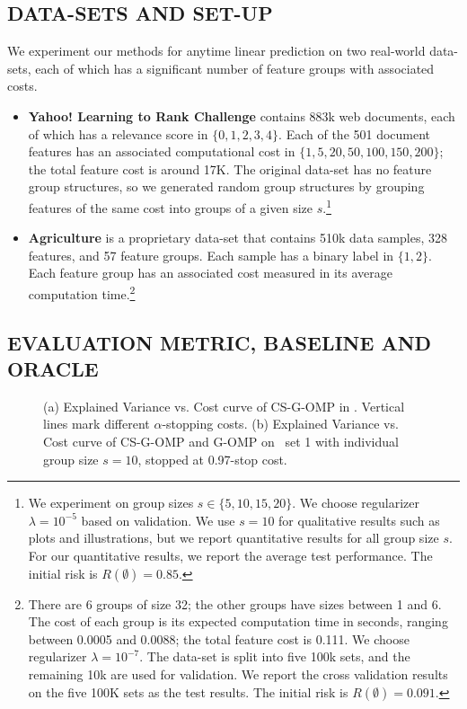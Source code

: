 \subsection{DATA-SETS AND SET-UP}
We experiment our methods for anytime linear prediction on two real-world data-sets,
each of which has a significant number of feature groups with associated costs. 

\begin{itemize}[leftmargin=*]
\item \textbf{Yahoo! Learning to Rank Challenge} \citep{yahoo_ltr}
contains 883k web documents, each of which has a relevance score in $\{0, 1, 2, 3, 4\}$. Each of the 501 document features has an associated computational cost in 
$\{ 1, 5, 20, 50, 100, 150, 200\}$; the total feature cost is around 17K. The original data-set has no feature group structures, so we generated random group structures by grouping features of the same cost into groups of a given size $s$.\footnote{We experiment on group sizes $s \in \{ 5, 10, 15, 20 \}$. We choose regularizer 
$\lambda = 10^{-5}$ based on validation. We use 
$s=10$ for qualitative results such as plots and illustrations, but we report quantitative results for all group size $s$. For our quantitative results, we report the average test performance. The initial risk is $R(\emptyset)=0.85$.}

\item \textbf{Agriculture} is a proprietary data-set that contains 510k data samples, 328 features, and 57 feature groups. Each sample has a binary label in $\{1, 2\}$. Each feature group has an associated cost measured in its 
average computation time.\footnote{
There are 6 groups of size 32; the other groups have sizes between 1 and 6. 
The cost of each group is its expected computation time in seconds, ranging between 0.0005 and 0.0088; the total feature cost is 0.111. 
We choose regularizer $\lambda = 10^{-7}$. The data-set is 
split into five 100k sets, and the remaining 10k are used for validation. We report the cross validation results on the five 100K sets as the test results. The initial risk is $R(\emptyset) = 0.091$.}
\end{itemize}

\subsection{EVALUATION METRIC, BASELINE AND ORACLE}
\label{sec:timeliness}
\begin{figure}[t]
\centering
{}

\label{fig:timeliness}
\caption{(a) Explained Variance vs. Cost curve of CS-G-OMP in
\YahooLTR. Vertical lines mark different $\alpha$-stopping costs.  (b) Explained Variance vs. Cost curve of CS-G-OMP and G-OMP on \YahooLTR\, set 1 with individual group size $s=10$, stopped at 0.97-stop cost.}
\end{figure}

